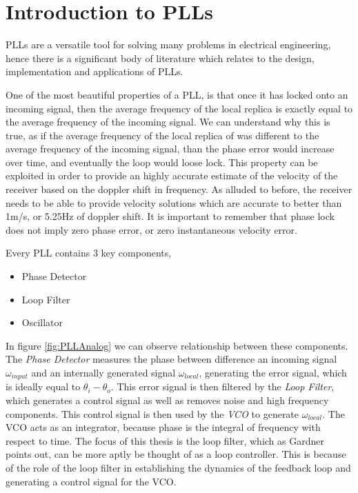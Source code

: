 \section{Introduction to PLLs}
PLLs are a versatile tool for solving many problems in electrical engineering, hence there is a significant body of literature which relates to the design, implementation and applications of PLLs. 

One of the most beautiful properties of a PLL, is that once it has locked onto an incoming signal, then the average frequency of the local replica is exactly equal to the average frequency of the incoming signal. We can understand why this is true, as if the average frequency of the local replica of was different to the average frequency of the incoming signal, than the phase error would increase over time, and eventually the loop would loose lock. This property can be exploited in order to provide an highly accurate estimate of the velocity of the receiver based on the doppler shift in frequency. As alluded to before, the receiver needs to be able to provide velocity solutions which are accurate to better than 1m/s, or 5.25Hz of doppler shift. It is important to remember that phase lock does not imply zero phase error, or zero instantaneous velocity error\cite{Gardner}. 



Every PLL contains 3 key components,

\begin{itemize}
\item{Phase Detector}
\item{Loop Filter}
\item{Oscillator}
\end{itemize}

In figure \ref{fig:PLLAnalog} we can observe relationship between these components. The \emph{Phase Detector} measures the phase between difference an incoming signal $\omega_{input}$ and an internally generated signal $\omega_{local}$, generating the error signal, which is ideally equal to $\theta_i -\theta_o$. This error signal is then filtered by the \emph{Loop Filter}, which generates a control signal as well as  removes noise and high frequency components. This control signal is then used by the \emph{\ac{VCO}} to generate $\omega_{local}$. The \ac{VCO} acts as an integrator, because phase is the integral of frequency with respect to time. The focus of this thesis is the loop filter, which as Gardner points out, can be more aptly be thought of as a loop controller\cite{Gardner}. This is because of the role of the loop filter in establishing the dynamics of the feedback loop and generating a control signal for the VCO\cite{Kaplan}.

